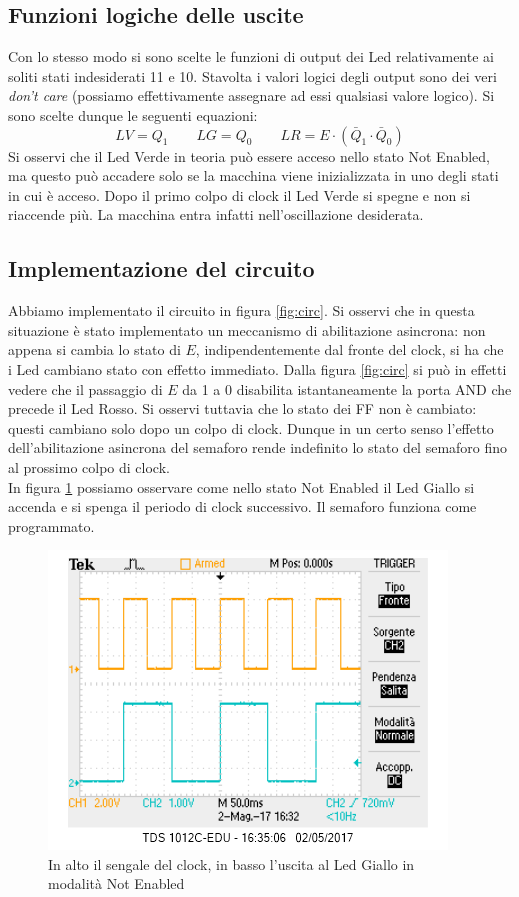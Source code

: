 \documentclass[10pt,a4paper]{article}
\begin{document}
\subsection{Funzioni logiche delle uscite}
Con lo stesso modo si sono scelte le funzioni di output dei Led relativamente ai soliti stati indesiderati 11 e 10. Stavolta i valori logici degli output sono dei veri \emph{don't care} (possiamo effettivamente assegnare ad essi qualsiasi valore logico). Si sono scelte dunque le seguenti equazioni:
\begin{equation}
LV = Q_1\qquad LG = Q_0\qquad LR = E\cdot(\bar{Q}_1\cdot\bar{Q}_0)
\end{equation}
Si osservi che il Led Verde in teoria può essere acceso nello stato Not Enabled, ma questo può accadere solo se la macchina viene inizializzata in uno degli stati in cui è acceso. Dopo il primo colpo di clock il Led Verde si spegne e non si riaccende più. La macchina entra infatti nell'oscillazione desiderata.\\

\subsection{Implementazione del circuito}
Abbiamo implementato il circuito in figura \ref{fig:circ}.
Si osservi che in questa situazione è stato implementato un meccanismo di abilitazione asincrona: non appena si cambia lo stato di $E$, indipendentemente dal fronte del clock, si ha che i Led cambiano stato con effetto immediato. Dalla figura \ref{fig:circ} si può in effetti vedere che il passaggio di $E$ da 1 a 0 disabilita istantaneamente la porta AND che precede il Led Rosso. Si osservi tuttavia che lo stato dei FF non è cambiato: questi cambiano solo dopo un colpo di clock. Dunque in un certo senso l'effetto dell'abilitazione asincrona del semaforo rende indefinito lo stato del semaforo fino al prossimo colpo di clock.\\
In figura \ref{fig:lampeggiante} possiamo osservare come nello stato Not Enabled il Led Giallo si accenda e si spenga il periodo di clock successivo. Il semaforo funziona come programmato.

\begin{figure}
\centering
\includegraphics[scale=0.7]{ch1clock-ch2giallolamp.png}
\caption{In alto il sengale del clock, in basso l'uscita al Led Giallo in modalità Not Enabled\label{fig:lampeggiante}}
\end{figure} 
\end{document}
